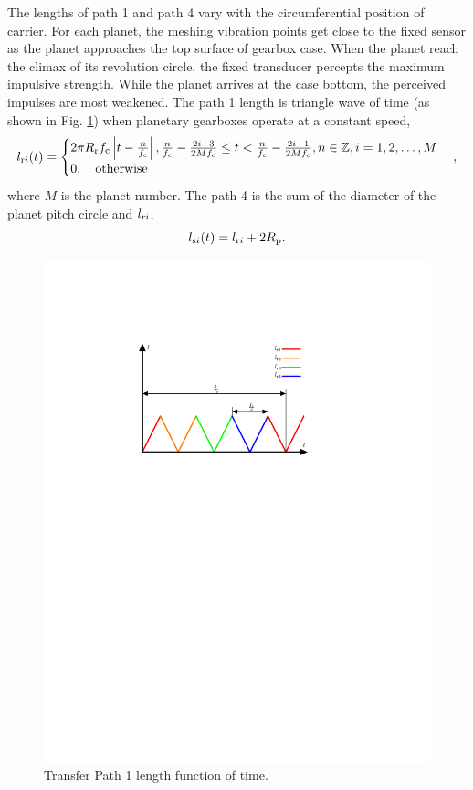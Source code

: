 \documentclass[a4paper,fleqn]{cas-sc}%
\begin{document}
\par The lengths of path 1 and path 4 vary with the circumferential position of carrier. For each planet, the meshing vibration points get close to the fixed sensor as the planet approaches the top surface of gearbox case. When the planet reach the climax of its revolution circle, the fixed transducer percepts the maximum impulsive strength. While the planet arrives at the case bottom, the perceived impulses are most weakened. The path 1 length is triangle wave of time (as shown in Fig. \ref{fig:path_length_trangle_wave}) when planetary gearboxes operate at a constant speed, 
\begin{equation}
    l_{{\rm r}i}(t)=
    \begin{cases}
        2 \pi R_{\rm r} f_{\rm c} \left|t-\frac{n}{f_{\rm c}}\right|, \frac{n}{f_{\rm c}} - \frac{2i-3}{2 M f_{\rm c}} \leq t < \frac{n}{f_{\rm c}} - \frac{2i-1}{2 M f_{\rm c}}, n\in \mathbb{Z} , i=1,2,\ldots,M\\
        0, \quad \text{otherwise}
    \end{cases},
\end{equation}
where $M$ is the planet number. The path 4 is the sum of the diameter of the planet pitch circle and $l_{{\rm r}i}$,
\begin{equation}
    l_{{\rm s}i}(t)=l_{{\rm r}i}+2 R_{\rm p}. \label{eq:path_4_length}
\end{equation}
\begin{figure}[pos=htbp]
    \centering
    \includegraphics[scale=0.5]{trangle_wave.pdf}
    \caption{Transfer Path 1 length function of time.}
    \label{fig:path_length_trangle_wave}
\end{figure}
\end{document}
